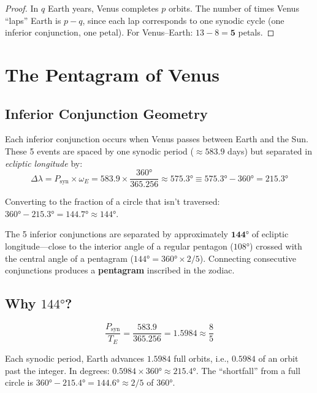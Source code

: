 \documentclass[11pt,letterpaper]{article}
\theoremstyle{definition}
\theoremstyle{plain}
\theoremstyle{remark}
\begin{document}
\begin{proof}
In $q$ Earth years, Venus completes $p$ orbits. The number of
times Venus ``laps'' Earth is $p - q$, since each lap corresponds
to one synodic cycle (one inferior conjunction, one petal).
For Venus--Earth: $13 - 8 = \mathbf{5}$ petals.
\end{proof}


\section{The Pentagram of Venus}
\label{sec:pentagram}

\subsection{Inferior Conjunction Geometry}

Each inferior conjunction occurs when Venus passes between Earth
and the Sun. These 5 events are spaced by one synodic period
($\approx 583.9$ days) but separated in \textit{ecliptic longitude}
by:
\begin{equation}
  \Delta\lambda
  = P_{\text{syn}} \times \omega_E
  = 583.9 \times \frac{360°}{365.256}
  \approx 575.3°
  \equiv 575.3° - 360° = 215.3°
  \label{eq:conj_separation}
\end{equation}

Converting to the fraction of a circle that isn't traversed:
$360° - 215.3° = 144.7° \approx 144°$.

\begin{keyresult}
The 5 inferior conjunctions are separated by approximately
$\mathbf{144°}$ of ecliptic longitude—close to the
interior angle of a regular pentagon ($108°$) crossed with
the central angle of a pentagram ($144° = 360° \times 2/5$).
Connecting consecutive conjunctions produces a
\textbf{pentagram} inscribed in the zodiac.
\end{keyresult}

\subsection{Why $144°$?}

\begin{equation}
  \frac{P_{\text{syn}}}{T_E}
  = \frac{583.9}{365.256}
  = 1.5984 \approx \frac{8}{5}
\end{equation}

Each synodic period, Earth advances $1.5984$ full orbits, i.e.,
$0.5984$ of an orbit past the integer. In degrees:
$0.5984 \times 360° \approx 215.4°$. The ``shortfall'' from a
full circle is $360° - 215.4° = 144.6° \approx 2/5$ of $360°$.
\end{document}
